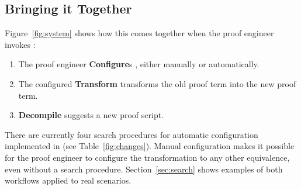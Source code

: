 \subsection*{Bringing it Together}

Figure~\ref{fig:system} shows how this comes together when the proof engineer invokes \toolname:

\begin{enumerate}
\item The proof engineer \textbf{Configure}s \toolname, either manually or automatically.
\item The configured \textbf{Transform} transforms the old proof term into the new proof term.
\item \textbf{Decompile} suggests a new proof script. %
\end{enumerate}

There are currently four search procedures for automatic configuration implemented in \toolname (see Table~\ref{fig:changes}).
Manual configuration makes it possible
for the proof engineer to configure the transformation to any other equivalence,
even without a search procedure.
Section~\ref{sec:search} shows examples of both workflows applied to real scenarios.


